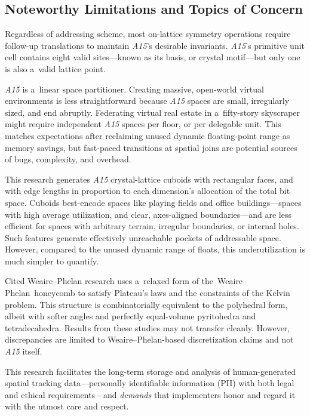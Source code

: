 \documentclass[10pt]{article}
\def\AAAB{\textit{A15}}
\def\WP{Weaire--Phelan} \def\WPH{Weaire--Phelan~Honeycomb} \def\TWPh{The~Weaire--Phelan~honeycomb}
\def\tWPh{the~Weaire--Phelan~honeycomb}
\begin{document}
\subsection{Noteworthy Limitations and Topics of Concern}\label{noteworthy-limitations-and-topics-of-concern}

Regardless of addressing scheme, most on-lattice symmetry operations require follow-up translations to maintain \AAAB's desirable
invariants. \AAAB{}'s primitive unit cell contains eight valid sites---known as its basis, or crystal motif---but only one is
also a~valid lattice point.

\AAAB{} is a~linear space partitioner. Creating massive, open-world virtual environments is less straightforward because \AAAB{}
spaces are small, irregularly sized, and end abruptly. Federating virtual real estate in a~fifty-story skyscraper might require
independent \AAAB{} spaces per floor, or per delegable unit. This matches expectations after reclaiming unused dynamic
floating-point range as memory savings, but fast-paced transitions at spatial joins are potential sources of bugs, complexity,
and overhead.

This research generates \AAAB{} crystal-lattice cuboids with rectangular faces, and with edge lengths in proportion to each
dimension's allocation of the total bit space. Cuboids best-encode spaces like playing fields and office buildings---spaces with
high average utilization, and clear, axes-aligned boundaries---and are less efficient for spaces with arbitrary terrain,
irregular boundaries, or internal holes. Such features generate effectively unreachable pockets of addressable space. However,
compared to the unused dynamic range of floats, this underutilization is much simpler to quantify.

Cited \WP{} research uses a~relaxed form of \tWPh{} to satisfy Plateau's laws and the constraints of the Kelvin problem. This
structure is combinatorially equivalent to the polyhedral form, albeit with softer angles and perfectly equal-volume pyritohedra
and tetradecahedra. Results from these studies may not transfer cleanly. However, discrepancies are limited to \WP-based
discretization claims and not \AAAB{} itself.

This research facilitates the long-term storage and analysis of human-generated spatial tracking data---personally identifiable
information (PII) with both legal and ethical requirements---and \emph{demands} that implementers honor and regard it with the
utmost care and respect.
\end{document}
